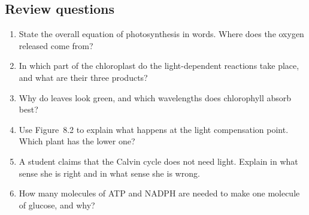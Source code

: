 \documentclass[11pt,a4paper]{article}
\begin{document}
\subsection*{\sffamily\large\bfseries\color{leaf} Review questions}
\begin{enumerate}[leftmargin=1.8em, itemsep=0.3em, label=\textbf{Q\arabic*}]
  \item State the overall equation of photosynthesis in words. Where does the oxygen released come from?
  \item In which part of the chloroplast do the light-dependent reactions take place, and what are their three products?
  \item Why do leaves look green, and which wavelengths does chlorophyll absorb best?
  \item Use Figure~8.2 to explain what happens at the light compensation point. Which plant has the lower one?
  \item A student claims that the Calvin cycle does not need light. Explain in what sense she is right and in what sense
        she is wrong.
  \item How many molecules of ATP and NADPH are needed to make one molecule of glucose, and why?
\end{enumerate}
\end{document}
